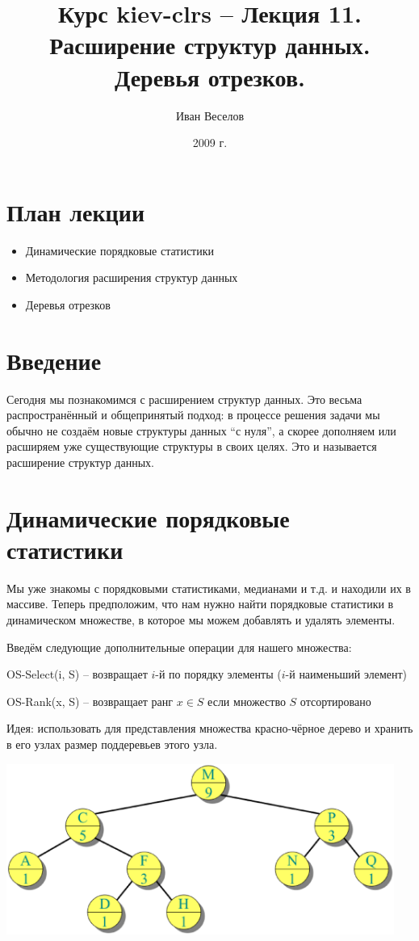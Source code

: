 \documentclass[a4paper,11pt]{article}
\author{Иван Веселов}
\title{Курс kiev-clrs -- Лекция 11. Расширение структур данных. Деревья отрезков.}
\date{2009 г.}
\begin{document}
\maketitle
\tableofcontents
\newpage

\setlength{\parskip}{1ex plus 0.5ex minus 0.2ex}

\section{План лекции}
\begin{itemize}
\item Динамические порядковые статистики
\item Методология расширения структур данных
\item Деревья отрезков
\end{itemize}

\section{Введение}

Сегодня мы познакомимся с расширением структур данных. Это весьма
распространённый и общепринятый подход: в процессе решения задачи мы обычно не создаём
новые структуры данных ``с нуля'', а скорее дополняем или расширяем уже
существующие структуры в своих целях. Это и называется расширение структур
данных.

\section{Динамические порядковые статистики}

Мы уже знакомы с порядковыми статистиками, медианами и т.д. и находили их в
массиве. Теперь предположим, что нам нужно найти порядковые статистики в
динамическом множестве, в которое мы можем добавлять и удалять элементы.

Введём следующие дополнительные операции для нашего множества:

OS-Select(i, S) -- возвращает $i$-й по порядку элементы ($i$-й наименьший
элемент)

OS-Rank(x, S) -- возвращает ранг $x \in S$ если множество $S$ отсортировано

Идея: использовать для представления множества красно-чёрное дерево и хранить в
его узлах размер поддеревьев этого узла.

\begin{center}
\includegraphics[width=5in]{lecture11/tree1.eps}
\end{center}
\end{document}
